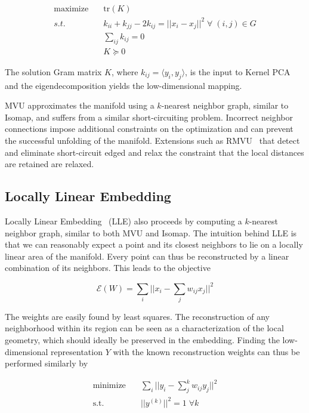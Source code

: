 \begin{align}
    \text{maximize} \quad & \text{tr}(K) \\
    s.t. \quad & k_{ii} + k_{jj} - 2k_{ij} = ||x_i - x_j||^2 \; \forall \; (i, j) \in G \nonumber \\
    & \sum_{ij} k_{ij} = 0 \nonumber \\
    & K \succeq 0 \nonumber
\end{align}

The solution Gram matrix $K$, where $k_{ij} = \langle y_i, y_j \rangle$, is the input to Kernel PCA and the
eigendecomposition yields the low-dimensional mapping.

MVU approximates the manifold using a $k$-nearest neighbor graph, similar to
Isomap, and suffers from a similar short-circuiting problem. Incorrect neighbor
connections impose additional constraints on the optimization and can prevent
the successful unfolding of the manifold. Extensions such as RMVU~\cite{rmvu}
that detect and eliminate short-circuit edged and relax the constraint that the
local distances are retained are relaxed.

\subsection{Locally Linear Embedding}

Locally Linear Embedding~\cite{intro_lle, lle} (LLE) also proceeds by computing a $k$-nearest
neighbor graph, similar to both MVU and Isomap. The intuition behind LLE is that we can reasonably expect
a point and its closest neighbors to lie on a locally linear area of the manifold. Every point
can thus be reconstructed by a linear combination of its neighbors. This leads to the
objective

\begin{equation}
    \mathcal{E}(W) = \sum_i || x_i - \sum_j w_{ij}x_j ||^2
\end{equation}

The weights are easily found by least squares. The reconstruction of any neighborhood within
its region can be seen as a characterization of the local geometry, which should ideally be preserved
in the embedding. Finding the low-dimensional representation $Y$ with the known reconstruction weights can thus be performed
similarly by

\begin{align}
    \text{minimize} \quad & \sum_i || y_i - \sum_j^k w_{ij}y_j ||^2 \\
    \text{s.t.} \quad & || y^{(k)} ||^2 = 1 \; \forall k
\end{align}


